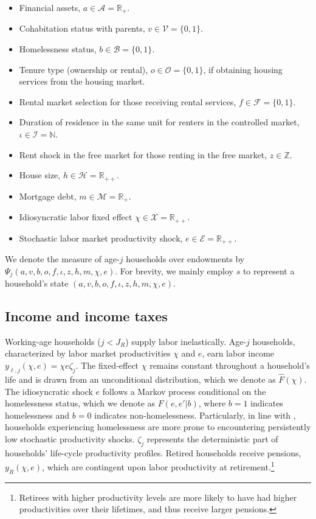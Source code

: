 \documentclass[parskip=full]{article}
\begin{document}
\begin{itemize}
    \item Financial assets, $a\in \mathcal{A}=\mathbb{R}_{+}$.
    \item Cohabitation status with parents, $v\in \mathcal{V}=\{0,1\}$.
    \item Homelessness status, $b \in \mathcal{B}=\{0,1\}$.
    \item Tenure type (ownership or rental), $o \in \mathcal{O}=\{0,1\}$, if obtaining housing services from the housing market.
    \item Rental market selection for those receiving rental services, $f \in \mathcal{F}=\{0,1\}$.
    \item Duration of residence in the same unit for renters in the controlled market, $\iota \in \mathcal{I}=\mathbb{N}$.
    \item Rent shock in the free market for those renting in the free market, $z \in \mathbb{Z}$.
    \item House size, $h\in \mathcal{H}=\mathbb{R}_{++}$.
    \item Mortgage debt, $m \in \mathcal{M}=\mathbb{R}_{+}$.
    \item Idiosyncratic labor fixed effect $\chi \in \mathcal{X}=\mathbb{R}_{++}$.
    \item Stochastic labor market productivity shock, $e \in \mathcal{E} = \mathbb{R}_{++}$.
\end{itemize}
 
\noindent We denote the measure of age-$j$ households over endowments by $\Psi_{j}(a,v,b,o,f,\iota,z,h,m,\chi,e)$. For brevity, we mainly employ $s$ to represent a household's state $(a,v,b,o,f,\iota,z,h,m,\chi,e)$.

\subsection{Income and income taxes}\label{subsection:income}

Working-age households ($j<J_{R}$) supply labor inelastically. Age-$j$ households, characterized by labor market productivities $\chi$ and $e$, earn labor income $y_{\ell,j}(\chi,e)=\chi e\zeta_j$. The fixed-effect $\chi$ remains constant throughout a household's life and is drawn from an unconditional distribution, which we denote as $\hat{F}(\chi)$. The idiosyncratic shock $e$ follows a Markov process conditional on the homelessness status, which we denote as $F(e,e'|b)$, where $b=1$ indicates homelessness and $b=0$ indicates non-homelessness. Particularly, in line with \citet{az-2024}, households experiencing homelessness are more prone to encountering persistently low stochastic productivity shocks. $\zeta_j$ represents the deterministic part of households' life-cycle productivity profiles. Retired households receive pensions, $y_{R}(\chi,e)$, which are contingent upon labor productivity at retirement.\footnote{Retirees with higher productivity levels are more likely to have had higher productivities over their lifetimes, and thus receive larger pensions.}
\end{document}
